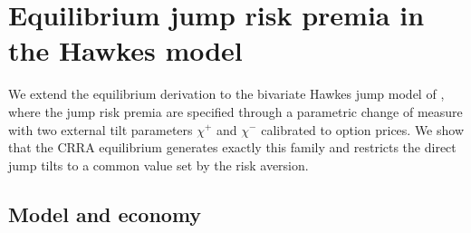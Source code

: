 \documentclass[11pt]{article}
\theoremstyle{remark}
\begin{document}
\section{Equilibrium jump risk premia in the Hawkes model}\label{sec:hawkes}

We extend the equilibrium derivation to the bivariate Hawkes jump model of \cite{LiuPackhamSepp2026}, where the jump risk premia are specified through a parametric change of measure with two external tilt parameters $\chi^{+}$ and $\chi^{-}$ calibrated to option prices. We show that the CRRA equilibrium generates exactly this family and restricts the direct jump tilts to a common value set by the risk aversion.

\subsection{Model and economy}
\end{document}
